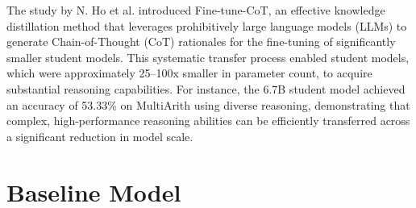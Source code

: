 \documentclass[conference]{IEEEtran}
\begin{document}


The study by N. Ho et al. \cite{b17} introduced Fine-tune-CoT, an effective knowledge distillation method that leverages prohibitively large language models (LLMs) to generate Chain-of-Thought (CoT) rationales for the fine-tuning of significantly smaller student models. This systematic transfer process enabled student models, which were approximately 25–100x smaller in parameter count, to acquire substantial reasoning capabilities. For instance, the 6.7B student model achieved an accuracy of 53.33\% on MultiArith using diverse reasoning, demonstrating that complex, high-performance reasoning abilities can be efficiently transferred across a significant reduction in model scale.


\section{Baseline Model}
\end{document}
